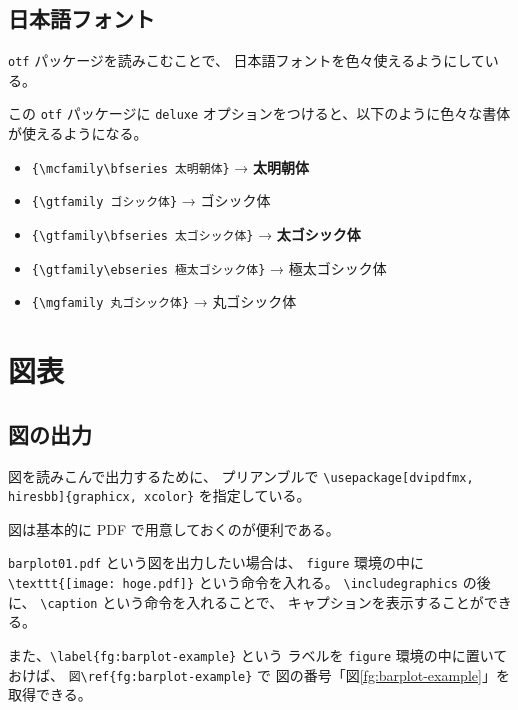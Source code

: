 \documentclass[ %
  uplatex,%
  a5paper,%
  papersize%
]{jsbook}
\begin{document}
\subsection{日本語フォント}

\texttt{otf} パッケージを読みこむことで、
日本語フォントを色々使えるようにしている。

この \texttt{otf} パッケージに \texttt{deluxe} オプションをつけると、以下のように色々な書体が使えるようになる。

\begin{itemize}
  \item \verb|{\mcfamily\bfseries 太明朝体}| → {\mcfamily\bfseries 太明朝体}
  \item \verb|{\gtfamily ゴシック体}| → {\gtfamily ゴシック体}
  \item \verb|{\gtfamily\bfseries 太ゴシック体}| → {\gtfamily\bfseries 太ゴシック体}
  \item \verb|{\gtfamily\ebseries 極太ゴシック体}| → {\gtfamily\ebseries 極太ゴシック体} 
  \item \verb|{\mgfamily 丸ゴシック体}| → {\mgfamily 丸ゴシック体} 
\end{itemize}


\section{図表}

\subsection{図の出力}
図を読みこんで出力するために、
プリアンブルで \verb|\usepackage[dvipdfmx, hiresbb]{graphicx, xcolor}| を指定している。

図は基本的に PDF で用意しておくのが便利である。

\verb|barplot01.pdf| という図を出力したい場合は、
\verb|figure| 環境の中に \verb|\texttt{[image: hoge.pdf]}| 
という命令を入れる。
\verb|\includegraphics| の後に、
\verb|\caption| という命令を入れることで、
キャプションを表示することができる。

また、\verb|\label{fg:barplot-example}| という
ラベルを \verb|figure| 環境の中に置いておけば、
\verb|図\ref{fg:barplot-example}| で
図の番号「図\ref{fg:barplot-example}」を
取得できる。
\end{document}
